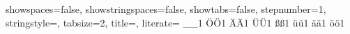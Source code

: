 {showspaces=false,                																		%
showstringspaces=false,          																		%
showtabs=false,                  																		%
stepnumber=1,                    																		%
stringstyle=\color{java_net_string},     																%
tabsize=2,	                   																		%
title=\lstname,                  		 																%
literate=%
{_}{{\_}}1
{Ö}{{\"O}}1
{Ä}{{\"A}}1
{Ü}{{\"U}}1
{ß}{{\ss}}1
{ü}{{\"u}}1
{ä}{{\"a}}1
{ö}{{\"o}}1																							%
}


